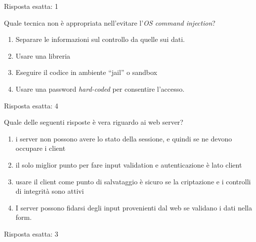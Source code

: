 \begin{Answer} [
  ref={esControlli2},
  number={2}
  ]

  \Question Risposta esatta: 1
\end{Answer}

\begin{Exercise} [
  title={Quiz},
  label={esControlli3}
  ]

  \Question Quale tecnica non è appropriata nell'evitare
  l'\textit{OS command injection}?
\begin{enumerate}
\item Separare le informazioni sul controllo da quelle sui dati.
\item Usare una libreria
\item Eseguire il codice in ambiente ``jail'' o sandbox
\item Usare una password \textit{hard-coded} per consentire l'accesso.
\end{enumerate}
 

\end{Exercise}

\begin{Answer} [
  ref={esControlli3},
  number={3}
  ]

  \Question Risposta esatta: 4
\end{Answer}


\begin{Exercise} [
  title={Quiz},
  label={esControlli4}
  ]

  \Question Quale delle seguenti risposte è vera riguardo ai web server?
  \begin{enumerate}
   \item i server non possono avere lo stato della sessione, e quindi se ne 
devono occupare i client
   \item il solo miglior punto per fare input validation e autenticazione è 
lato client
   \item usare il client come punto di salvataggio è sicuro se la criptazione 
e i controlli di integrità sono attivi
   \item I server possono fidarsi degli input provenienti dal web se validano i 
dati nella form.
  \end{enumerate}
\end{Exercise}

\begin{Answer} [
  ref={esControlli4},
  number={4}
  ]

  \Question Risposta esatta: 3
\end{Answer}

